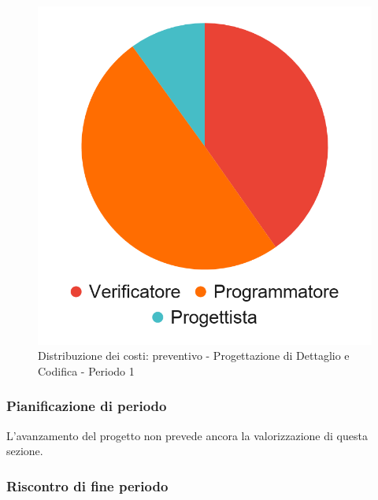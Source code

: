 \hspace{-1cm}
\begin{minipage}{.50\textwidth}
\smallPreventivoTable{
	
}
\end{minipage}
\hspace{1cm}
\begin{minipage}{.40\textwidth}
\begin{figure}[H]
	\includegraphics[scale=0.21]{res/images/charts/preventivo_priori/Grafico4-6.png}
	\caption{Distribuzione dei costi: preventivo - Progettazione di Dettaglio e Codifica - Periodo 1}
\end{figure}
\end{minipage} 



\subsubsection{Pianificazione di periodo}

L'avanzamento del progetto non prevede ancora la valorizzazione di questa sezione.


\subsubsection{Riscontro di fine periodo}


